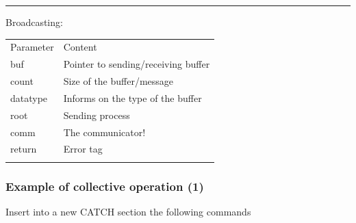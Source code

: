 \begin{center}\rule{3in}{0.4pt}\end{center}

Broadcasting:

\begin{Shaded}
\begin{Highlighting}[]
    
\end{Highlighting}
\end{Shaded}

\begin{longtable}[c]{@{}ll@{}}
\toprule\addlinespace
Parameter & Content
\\\addlinespace
\midrule\endhead
buf & Pointer to sending/receiving buffer
\\\addlinespace
count & Size of the buffer/message
\\\addlinespace
datatype & Informs on the type of the buffer
\\\addlinespace
root & Sending process
\\\addlinespace
comm & The communicator!
\\\addlinespace
return & Error tag
\\\addlinespace
\bottomrule
\end{longtable}

\subsubsection{Example of collective operation
(1)}\label{example-of-collective-operation-1}

Insert into a new CATCH section the following commands

\begin{Shaded}
\begin{Highlighting}[]

       \NormalTok{;}
      \NormalTok{;}
       
       \NormalTok{) \{}
             \NormalTok{(}
      \NormalTok{\} } \NormalTok{\{}
           \NormalTok{buffer[}\NormalTok{];}
      \NormalTok{\}}
\end{Highlighting}
\end{Shaded}

